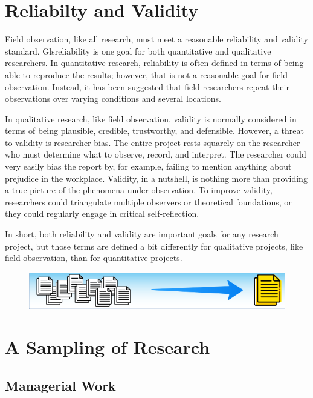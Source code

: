 \section{Reliabilty and Validity}

Field observation, like all research, must meet a reasonable reliability and validity standard. Gls{reliability} is one goal for both quantitative and qualitative researchers. In quantitative research, reliability is often defined in terms of being able to reproduce the results; however, that is not a reasonable goal for field observation. Instead, it has been suggested that field researchers repeat their observations over varying conditions and several locations.

In qualitative research, like field observation, \gls{validity} is normally considered in terms of being plausible, credible, trustworthy, and defensible. However, a threat to validity is researcher bias. The entire project rests squarely on the researcher who must determine what to observe, record, and interpret. The researcher could very easily bias the report by, for example, failing to mention anything about prejudice in the workplace. Validity, in a nutshell, is nothing more than providing a true picture of the phenomena under observation. To improve validity, researchers could triangulate multiple observers or theoretical foundations, or they could regularly engage in critical self-reflection. 

In short, both reliability and validity are important goals for any research project, but those terms are defined a bit differently for qualitative projects, like field observation, than for quantitative projects.

\begin{figure}[H]
	\centering
	\includegraphics[width=\maxwidth{.95\linewidth}]{gfx/Sampling_Of_Research}
	\caption*{}
	\label{05:sampling_of_research}
\end{figure}
\section{A Sampling of Research}

\subsection{Managerial Work}

